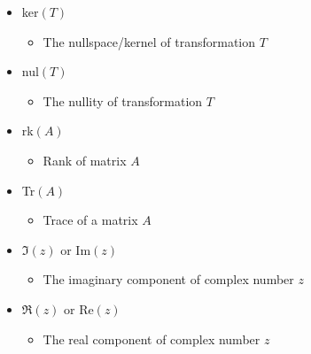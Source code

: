 \begin{itemize}
\item ker$(T)$
\begin{itemize}
\item The nullspace/kernel of transformation $T$
\end{itemize}

\item nul$(T)$
\begin{itemize}
\item The nullity of transformation $T$
\end{itemize}

\item rk$(A)$
\begin{itemize}
\item Rank of matrix $A$
\end{itemize}

\item Tr$(A)$
\begin{itemize}
\item Trace of a matrix $A$
\end{itemize}

\item $\Im(z)$ or Im$(z)$
\begin{itemize}
\item The imaginary component of complex number $z$
\end{itemize}

\item $\Re(z)$ or Re$(z)$
\begin{itemize}
\item The real component of complex number $z$
\end{itemize}				
\end{itemize}